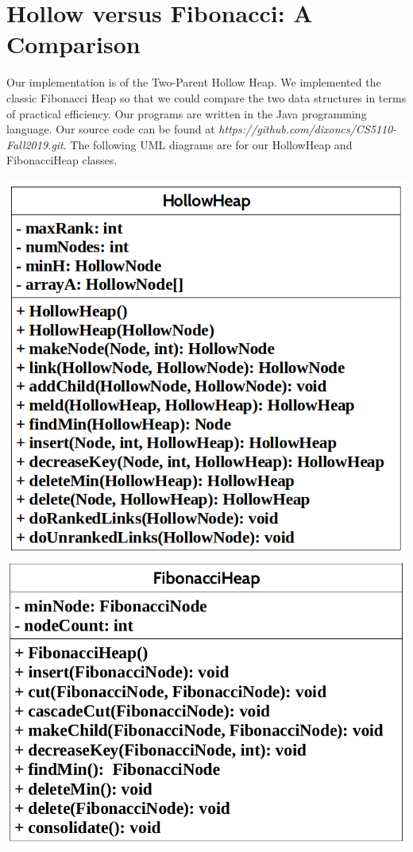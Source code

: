 \documentclass[letter,10pt]{article}
\begin{document}
\section{Hollow versus Fibonacci: A Comparison}
\quad Our implementation is of the Two-Parent Hollow Heap. We implemented the classic Fibonacci Heap so that we could compare the two data structures in terms of practical efficiency. Our programs are written in the Java programming language. Our source code can be found at \textit {https://github.com/dixoncs/CS5110-Fall2019.git}. The following UML diagrams are for our HollowHeap and FibonacciHeap classes. 
\begin{center}
	\includegraphics[scale=0.32]{hollowuml.png}\includegraphics[scale=0.32]{fibonacciheapuml.png}
\end{center}
\end{document}
